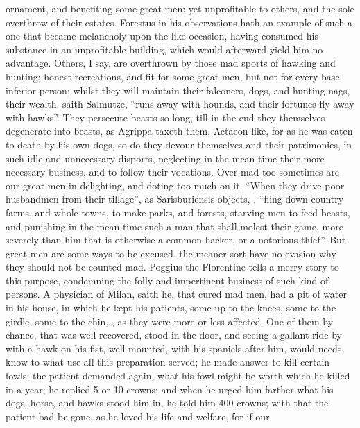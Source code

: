 ornament, and benefiting some great men: yet unprofitable to others, and the
sole overthrow of their estates. Forestus in his observations hath an example
of such a one that became melancholy upon the like occasion, having consumed
his substance in an unprofitable building, which would afterward yield him no
advantage. Others, I say, are overthrown by those mad
sports of hawking and hunting; honest recreations, and fit for some great men,
but not for every base inferior person; whilst they will maintain their
falconers, dogs, and hunting nags, their wealth, saith
Salmutze, \enquote{runs away with hounds, and their fortunes fly
away with hawks}. They persecute beasts so long, till in the end they
themselves degenerate into beasts, as Agrippa taxeth them,
Actaeon like, for as he was eaten to death by his own
dogs, so do they devour themselves and their patrimonies, in such idle and
unnecessary disports, neglecting in the mean time their more necessary
business, and to follow their vocations. Over-mad too sometimes are our great
men in delighting, and doting too much on it. \enquote{When they
drive poor husbandmen from their tillage}, as
Sarisburiensis objects, , \enquote{fling down country farms, and whole towns, to make parks, and
forests, starving men to feed beasts, and punishing in the
mean time such a man that shall molest their game, more severely than him that
is otherwise a common hacker, or a notorious thief}. But great men are some
ways to be excused, the meaner sort have no evasion why they should not be
counted mad. Poggius the Florentine tells a merry story to this purpose,
condemning the folly and impertinent business of such kind of persons. A
physician of Milan, saith he, that cured mad men, had a pit of water in his
house, in which he kept his patients, some up to the knees, some to the girdle,
some to the chin, , as they were more or less affected.
One of them by chance, that was well recovered, stood in the door, and seeing a
gallant ride by with a hawk on his fist, well mounted, with his spaniels after
him, would needs know to what use all this preparation served; he made answer
to kill certain fowls; the patient demanded again, what his fowl might be worth
which he killed in a year; he replied 5 or 10 crowns; and when he urged him
farther what his dogs, horse, and hawks stood him in, he told him 400 crowns;
with that the patient bad be gone, as he loved his life and welfare, for if our
